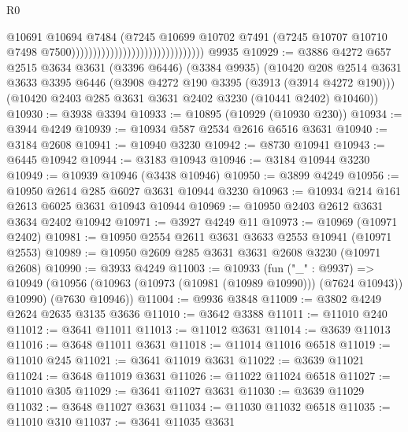 \begin{lexlean}{R0}
\begin{coremodule}
                                                              @10691
                                                              @10694
                                                              @7484
                                                              (@7245
                                                                @10699
                                                                @10702
                                                                @7491
                                                                (@7245
                                                                  @10707
                                                                  @10710
                                                                  @7498
                                                                  @7500)))))))))))))))))))))))))))))))
    @9935
@10929 := @3886
    @4272
    @657
    @2515
    @3634
    @3631
    (@3396 @6446)
    (@3384 @9935)
    (@10420
      @208
      @2514
      @3631
      @3633
      @3395
      @6446
      (@3908 @4272 @190 @3395 (@3913 (@3914 @4272 @190)))
      (@10420 @2403 @285 @3631 @3631 @2402 @3230 (@10441 @2402) @10460))
@10930 := @3938 @3394
@10933 := @10895 (@10929 (@10930 @230))
@10934 := @3944 @4249
@10939 := @10934 @587 @2534 @2616 @6516 @3631
@10940 := @3184 @2608
@10941 := @10940 @3230
@10942 := @8730 @10941
@10943 := @6445 @10942
@10944 := @3183 @10943
@10946 := @3184 @10944 @3230
@10949 := @10939 @10946 (@3438 @10946)
@10950 := @3899 @4249
@10956 := @10950 @2614 @285 @6027 @3631 @10944 @3230
@10963 := @10934 @214 @161 @2613 @6025 @3631 @10943 @10944
@10969 := @10950 @2403 @2612 @3631 @3634 @2402 @10942
@10971 := @3927 @4249 @11
@10973 := @10969 (@10971 @2402)
@10981 := @10950 @2554 @2611 @3631 @3633 @2553 @10941 (@10971 @2553)
@10989 := @10950 @2609 @285 @3631 @3631 @2608 @3230 (@10971 @2608)
@10990 := @3933 @4249
@11003 := @10933
    (fun ("_" : @9937) =>
    @10949 (@10956 (@10963 (@10973 (@10981 (@10989 @10990))) (@7624 @10943)) @10990) (@7630 @10946))
@11004 := @9936 @3848
@11009 := @3802 @4249 @2624 @2635 @3135 @3636
@11010 := @3642 @3388
@11011 := @11010 @240
@11012 := @3641 @11011
@11013 := @11012 @3631
@11014 := @3639 @11013
@11016 := @3648 @11011 @3631
@11018 := @11014 @11016 @6518
@11019 := @11010 @245
@11021 := @3641 @11019 @3631
@11022 := @3639 @11021
@11024 := @3648 @11019 @3631
@11026 := @11022 @11024 @6518
@11027 := @11010 @305
@11029 := @3641 @11027 @3631
@11030 := @3639 @11029
@11032 := @3648 @11027 @3631
@11034 := @11030 @11032 @6518
@11035 := @11010 @310
@11037 := @3641 @11035 @3631

\end{coremodule}
\end{lexlean}
